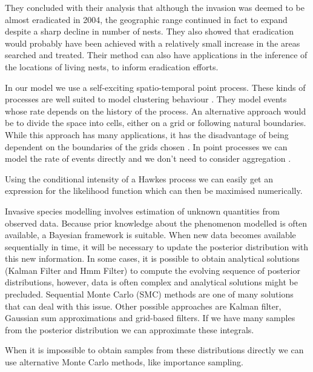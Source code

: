 \documentclass[11pt,a4paper]{article}
\begin{document}
They concluded with their analysis that although the invasion was deemed to be almost eradicated in 2004, the geographic range continued in fact to expand despite a sharp decline in number of nests. They also showed that eradication would probably have been achieved with a relatively small increase in the areas searched and treated. Their method can also have applications in the inference of the locations of living nests, to inform eradication efforts.


In our model we use a self-exciting spatio-temporal point process. These kinds of processes are well suited to model clustering behaviour \cite{Reinhart}. They model events whose rate depends on the history of the process. An alternative approach would be to divide the space into cells, either on a grid or following natural boundaries. While this approach has many applications, it has the disadvantage of being dependent on the boundaries of the grids chosen \cite{Fotheringham}. In point processes we can model the rate of events directly and we don't need to consider aggregation \cite{Reinhart}.

Using the conditional intensity of a Hawkes process we can easily get an expression for the likelihood function which can then be maximised numerically.

Invasive species modelling involves estimation of unknown quantities from observed data. Because prior knowledge about the phenomenon modelled is often available, a Bayesian framework is suitable.
When new data becomes available sequentially in time, it will be necessary to update the posterior distribution with this new information.
In some cases, it is possible to obtain analytical solutions (Kalman Filter and Hmm Filter) to compute the evolving sequence of posterior distributions, however, data is often complex and analytical solutions might be precluded.
Sequential Monte Carlo (SMC) methods are one of many solutions that can deal with this issue. Other possible approaches are Kalman filter, Gaussian sum approximations and grid-based filters.
If we have many samples from the posterior distribution we can approximate these integrals. 

When it is impossible to obtain samples from these distributions directly we can use alternative Monte Carlo methods, like importance sampling.
\end{document}
